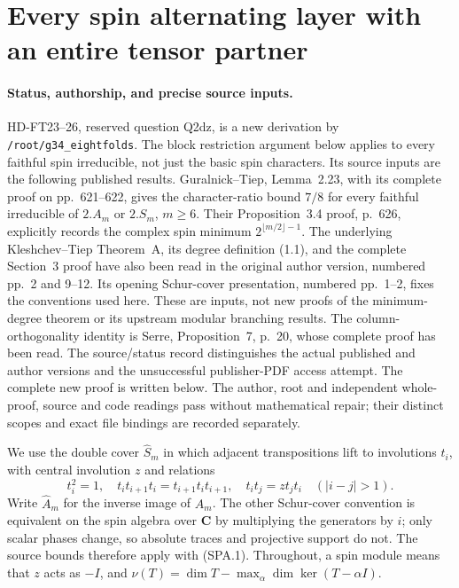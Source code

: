\section{Every spin alternating layer with an entire tensor partner}
\label{sec:spin-alternating-layers}

\paragraph{Status, authorship, and precise source inputs.}
HD-FT23--26, reserved question Q2dz, is a new derivation by
\texttt{/root/g34\_eightfolds}.  The block restriction argument below
applies to every faithful spin irreducible, not just the basic spin
characters.  Its source inputs are the following published results.
Guralnick--Tiep, Lemma~2.23, with its complete proof on pp.~621--622,
gives the character-ratio bound $7/8$ for every faithful irreducible
of $2.A_m$ or $2.S_m$, $m\ge6$.
Their Proposition~3.4 proof, p.~626, explicitly records the complex
spin minimum $2^{\lfloor m/2\rfloor-1}$.
\cite{HD:GT2012}
The underlying Kleshchev--Tiep Theorem~A, its degree definition (1.1),
and the complete Section~3 proof have also been read in the original
author version, numbered pp.~2 and 9--12.  Its opening Schur-cover
presentation, numbered pp.~1--2, fixes the conventions used here.
\cite{HD:KT2004}
These are inputs, not new proofs of the minimum-degree theorem or its
upstream modular branching results.  The column-orthogonality identity
is Serre, Proposition~7, p.~20, whose complete proof has been read.
\cite{OG:Serre1977}
The source/status record distinguishes the actual published and author
versions and the unsuccessful publisher-PDF access attempt.  The
complete new proof is written below. The author, root and independent
whole-proof, source and code readings pass without mathematical repair;
their distinct scopes and exact file bindings are recorded separately.

We use the double cover $\widehat S_m$ in which adjacent transpositions
lift to involutions $t_i$, with central involution $z$ and relations
\[
 t_i^2=1,\quad t_it_{i+1}t_i=t_{i+1}t_it_{i+1},\quad
 t_it_j=z t_jt_i\quad (|i-j|>1).
 \tag{SPA.1}
\]
Write $\widehat A_m$ for the inverse image of $A_m$.
The other Schur-cover convention is equivalent on the spin algebra
over $\mathbf C$ by multiplying the generators by $i$; only scalar
phases change, so absolute traces and projective support do not.
The source bounds therefore apply with (SPA.1).
Throughout, a spin module means that $z$ acts as $-I$, and
$\nu(T)=\dim T-\max_\alpha\dim\ker(T-\alpha I)$.

